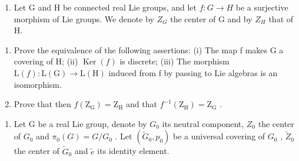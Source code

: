 \begin{enumerate}
\def\labelenumi{\arabic{enumi})}
\setcounter{enumi}{5}
\tightlist
\item
  Let G and H be connected real Lie groups, and let \(f: G \to H\) be a surjective morphism of Lie groups. We denote by \(Z_{G}\) the center of G and by \(Z_{H}\) that of H.
\end{enumerate}

\begin{enumerate}
\def\labelenumi{\alph{enumi})}
\item
  Prove the equivalence of the following assertions: (i) The map f makes G a covering of H; (ii) \(\operatorname{Ker}(f)\) is discrete; (iii) The morphism \(\mathrm{L}(f)\colon\mathrm{L}(\mathrm{G})\to\mathrm{L}(\mathrm{H})\) induced from f by passing to Lie algebras is an isomorphism.
\item
  Prove that then \(f(\mathrm{Z}_{\mathrm{G}})=\mathrm{Z}_{\mathrm{H}}\) and that \(f^{-1}(\mathrm{Z}_{\mathrm{H}})=\mathrm{Z}_{\mathrm{G}}\) .
\end{enumerate}

\begin{enumerate}
\def\labelenumi{\arabic{enumi})}
\setcounter{enumi}{6}
\tightlist
\item
  Let G be a real Lie group, denote by \(G_{0}\) its neutral component, \(Z_{0}\) the center of \(G_{0}\) and \(\pi_{0}(G)=G/G_{0}\) . Let \((\widetilde{G}_{0},p_{0})\) be a universal covering of \(G_{0}\) , \(\widetilde{Z}_{0}\) the center of \(\widetilde{G}_{0}\) and \(\widetilde{e}\) its identity element.
\end{enumerate}

